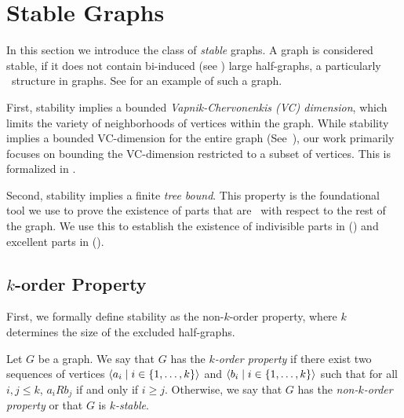 \section{Stable Graphs} \label{sec:section_3}

    In this section we introduce the class of \emph{stable} graphs.
    A graph is considered stable, if it does not contain bi-induced (see )
    large half-graphs, a particularly \irregular{}~structure in graphs.
    See  for an example of such a graph.

    

    First, stability implies a bounded \emph{Vapnik-Chervonenkis (VC) dimension}, which limits the variety of
    neighborhoods of vertices within the graph.
    While stability implies a bounded VC-dimension for the entire graph
    (See~\cite{regularity_partitions_and_the_topology_of_graphons}), our work primarily focuses on bounding
    the VC-dimension restricted to a subset of vertices.
    This is formalized in .

    Second, stability implies a finite \emph{tree bound}.
    This property is the foundational tool we use to prove the existence of parts that are \regular~with
    respect to the rest of the graph.
    We use this to establish the existence of indivisible parts in 
    () and
    excellent parts in  ().

    \subsection{$k$-order Property} \label{subsec:subsection_3.1}

        First, we formally define stability as the non-$k$-order property, where $k$ determines the size of the
        excluded half-graphs.

        \begin{definition} \label{def:k_order_property}
            Let $G$ be a graph.
            We say that $G$ has the \emph{$k$-order property} if there exist two sequences of vertices
            $\left< a_i \mid i \in \{ 1, \dots, k \} \right>$ and $\left< b_i \mid i \in \{ 1, \dots, k \} \right>$ such that
            for all $i,j \leq k$, $a_i R b_j$ if and only if $i \geq j$.
            Otherwise, we say that $G$ has the \emph{non-$k$-order property} or that $G$ is \emph{$k$-stable}.
        \end{definition}

